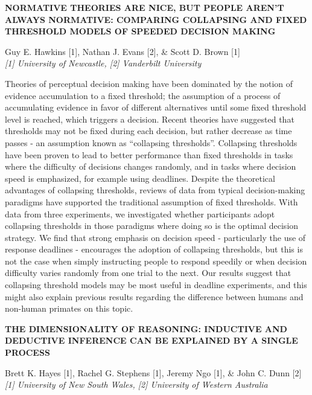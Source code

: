 \documentclass[]{article}
\begin{document}
\textbf{NORMATIVE THEORIES ARE NICE, BUT PEOPLE AREN'T ALWAYS NORMATIVE:
COMPARING COLLAPSING AND FIXED THRESHOLD MODELS OF SPEEDED DECISION
MAKING}

Guy E. Hawkins {[}1{]}, Nathan J. Evans {[}2{]}, \& Scott D. Brown
{[}1{]}\\
\emph{{[}1{]} University of Newcastle, {[}2{]} Vanderbilt University}

Theories of perceptual decision making have been dominated by the notion
of evidence accumulation to a fixed threshold; the assumption of a
process of accumulating evidence in favor of different alternatives
until some fixed threshold level is reached, which triggers a decision.
Recent theories have suggested that thresholds may not be fixed during
each decision, but rather decrease as time passes - an assumption known
as ``collapsing thresholds''. Collapsing thresholds have been proven to
lead to better performance than fixed thresholds in tasks where the
difficulty of decisions changes randomly, and in tasks where decision
speed is emphasized, for example using deadlines. Despite the
theoretical advantages of collapsing thresholds, reviews of data from
typical decision-making paradigms have supported the traditional
assumption of fixed thresholds. With data from three experiments, we
investigated whether participants adopt collapsing thresholds in those
paradigms where doing so is the optimal decision strategy. We find that
strong emphasis on decision speed - particularly the use of response
deadlines - encourages the adoption of collapsing thresholds, but this
is not the case when simply instructing people to respond speedily or
when decision difficulty varies randomly from one trial to the next. Our
results suggest that collapsing threshold models may be most useful in
deadline experiments, and this might also explain previous results
regarding the difference between humans and non-human primates on this
topic.\\
\pagebreak  

\textbf{THE DIMENSIONALITY OF REASONING: INDUCTIVE AND DEDUCTIVE
INFERENCE CAN BE EXPLAINED BY A SINGLE PROCESS}

Brett K. Hayes {[}1{]}, Rachel G. Stephens {[}1{]}, Jeremy Ngo {[}1{]},
\& John C. Dunn {[}2{]}\\
\emph{{[}1{]} University of New South Wales, {[}2{]} University of
Western Australia}
\end{document}
